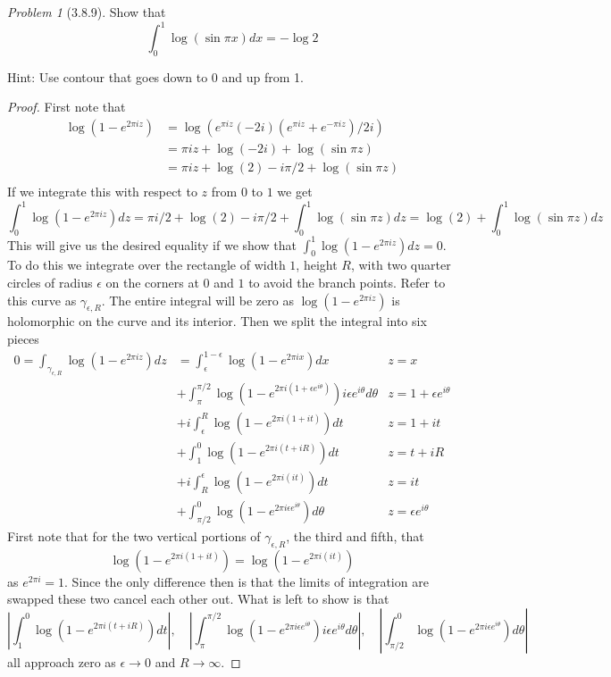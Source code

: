 \documentclass[10pt]{article}
\newcommand{\sk}{\vskip 10mm}
\theoremstyle{remark}
\newtheorem{problem}{Problem}
\theoremstyle{remark}
\begin{document}
\sk

\begin{problem}[3.8.9]
  Show that
  \[
    \int_0^1\log(\sin\pi x)dx = -\log 2
  \]

  Hint: Use contour that goes down to 0 and up from 1.
\end{problem}

\begin{proof}
  First note that
  \begin{align*}
    \log(1-e^{2\pi iz}) &=\log(e^{\pi iz}(-2i)(e^{\pi iz}+e^{-\pi iz})/2i)\\
                      &=\pi iz + \log(-2i)+\log(\sin\pi z)\\
                      &= \pi iz + \log(2)-i\pi/2+\log(\sin\pi z)\\
  \end{align*}
  If we integrate this with respect to $z$ from $0$ to $1$ we get
  \[
    \int_0^1\log(1-e^{2\pi iz})dz=\pi i/2+\log(2)-i\pi/2+\int_0^1\log(\sin\pi z) dz = \log(2)+\int_0^1\log(\sin\pi z) dz
  \]
  This will give us the desired equality if we show that $\int_0^1\log(1-e^{2\pi iz})dz=0$. To do this
  we integrate over the rectangle of width $1$, height $R$, with two quarter circles of radius $\epsilon$
  on the corners at $0$ and $1$ to avoid the branch points. Refer to this curve as $\gamma_{\epsilon,R}$. The
  entire integral will be zero as $\log(1-e^{2\pi iz})$ is holomorphic on the curve and its interior.
  Then we split the integral into six pieces
  \begin{align*}
    0 = \int_{\gamma_{\epsilon,R}}\log(1-e^{2\pi iz})dz &= \int_\epsilon^{1-\epsilon}\log(1-e^{2\pi ix}) dx & z=x\\
                                                     &+ \int_{\pi}^{\pi/2}\log(1-e^{2\pi i(1+\epsilon e^{i\theta})})i\epsilon e^{i\theta}d\theta & z=1+\epsilon e^{i\theta}\\
                                                     &+ i\int_\epsilon^R\log(1-e^{2\pi i(1+it)})dt & z=1+it\\
                                                     &+ \int_1^0\log(1-e^{2\pi i(t+iR)})dt & z=t+iR\\
                                                     &+ i\int_R^\epsilon\log(1-e^{2\pi i(it)}) dt & z=it\\
                                                     &+ \int_{\pi/2}^0\log(1-e^{2\pi i \epsilon e^{i\theta}}) d\theta & z=\epsilon e^{i\theta}
  \end{align*}
  First note that for the two vertical portions of $\gamma_{\epsilon,R}$, the third and fifth, that
  \[
    \log(1-e^{2\pi i(1+it)}) = \log(1-e^{2\pi i(it)})
  \]
  as $e^{2\pi i }=1$. Since the only difference then is that the limits of integration are swapped
  these two cancel each other out. What is left to show is that
  \[
    \left|\int_1^0\log(1-e^{2\pi i(t+iR)})dt\right|,\quad\left|\int_{\pi}^{\pi/2}\log(1-e^{2\pi i\epsilon e^{i\theta}})i\epsilon e^{i\theta}d\theta\right|,\quad \left|\int_{\pi/2}^0\log(1-e^{2\pi i \epsilon e^{i\theta}}) d\theta\right|
  \]
  all approach zero as $\epsilon\rightarrow 0 $ and $R\rightarrow\infty$.


\end{proof}
\end{document}
